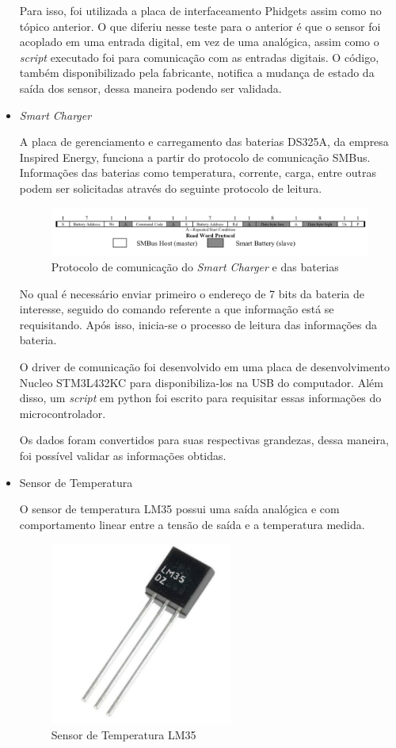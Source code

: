 \begin{itemize}
Para isso, foi utilizada a placa de interfaceamento Phidgets assim como no tópico anterior. O que diferiu nesse teste para o anterior é que o sensor foi acoplado em uma entrada digital, em vez de uma analógica, assim como o \textit{script} executado foi para comunicação com as entradas digitais. O código, também disponibilizado pela fabricante, notifica a mudança de estado da saída dos sensor, dessa maneira podendo ser validada.

\item \textit{Smart Charger}

A placa de gerenciamento e carregamento das baterias DS325A, da empresa Inspired Energy, funciona a partir do protocolo de comunicação SMBus. Informações das baterias como temperatura, corrente, carga, entre outras podem ser solicitadas através do seguinte protocolo de leitura.

\begin{figure}[!ht]
	\centering
	\includegraphics[width=16cm]{Figures/batt_protocol.png}
	\caption{Protocolo de comunicação do \textit{Smart Charger} e das baterias}
	\label{fig:batt_protocol}
\end{figure}   

No qual é necessário enviar primeiro o endereço de 7 bits da bateria de interesse, seguido do comando referente a que informação está se requisitando. Após isso, inicia-se o processo de leitura das informações da bateria.

O driver de comunicação foi desenvolvido em uma placa de desenvolvimento Nucleo STM3L432KC para disponibiliza-los na USB do computador. Além disso, um \textit{script} em python foi escrito para requisitar essas informações do microcontrolador.

Os dados foram convertidos para suas respectivas grandezas, dessa maneira, foi possível validar as informações obtidas.

\item Sensor de Temperatura

O sensor de temperatura LM35 possui uma saída analógica e com comportamento linear entre a tensão de saída e a temperatura medida.

\begin{figure}[!ht]
	\centering
	\includegraphics[width=6cm]{Figures/lm35.jpg}
	\caption{Sensor de Temperatura LM35}
	\label{fig:LM35}
\end{figure}


\end{itemize}
